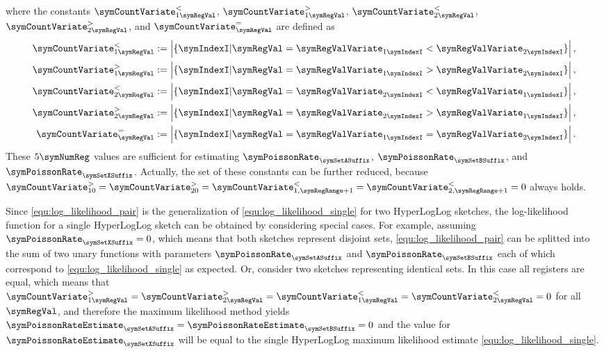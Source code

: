 \documentclass[a4paper]{scrartcl}
\begin{document}
where the constants
$\symCountVariate^{<}_{1\symRegVal}$,
$\symCountVariate^{>}_{1\symRegVal}$,
$\symCountVariate^{<}_{2\symRegVal}$,
$\symCountVariate^{>}_{2\symRegVal}$,
and $\symCountVariate^{=}_{\symRegVal}$ are defined as
\begin{equation}
\label{equ:sufficient_joint_statistic}
\begin{aligned}
\symCountVariate^{<}_{1\symRegVal}&:=\left|\lbrace\symIndexI\vert\symRegVal=\symRegValVariate_{1\symIndexI}<
\symRegValVariate_{2\symIndexI}\rbrace\right|,
\\
\symCountVariate^{>}_{1\symRegVal}&:=\left|\lbrace\symIndexI\vert\symRegVal=\symRegValVariate_{1\symIndexI}>
\symRegValVariate_{2\symIndexI}\rbrace\right|,
\\
\symCountVariate^{<}_{2\symRegVal}&:=\left|\lbrace\symIndexI\vert\symRegVal=\symRegValVariate_{2\symIndexI}<
\symRegValVariate_{1\symIndexI}\rbrace\right|,
\\
\symCountVariate^{>}_{2\symRegVal}&:=\left|\lbrace\symIndexI\vert\symRegVal=\symRegValVariate_{2\symIndexI}>
\symRegValVariate_{1\symIndexI}\rbrace\right|,
\\
\symCountVariate^{=}_{\symRegVal}&:=\left|\lbrace\symIndexI\vert\symRegVal=\symRegValVariate_{1\symIndexI}=
\symRegValVariate_{2\symIndexI}\rbrace\right|.
\end{aligned}
\end{equation}
These $5\symNumReg$ values are sufficient for estimating $\symPoissonRate_\symSetASuffix$, $\symPoissonRate_\symSetBSuffix$, and $\symPoissonRate_\symSetXSuffix$. Actually, the set of these constants can be further reduced, because $\symCountVariate^{>}_{10}=\symCountVariate^{>}_{20}=
\symCountVariate^{<}_{1,\symRegRange+1}=\symCountVariate^{<}_{2,\symRegRange+1}=0$
always holds.

Since \eqref{equ:log_likelihood_pair} is the generalization of \eqref{equ:log_likelihood_single} for two HyperLogLog sketches, the log-likelihood function for a single HyperLogLog sketch can be obtained by considering special cases. For example, assuming $\symPoissonRate_\symSetXSuffix=0$, which means that both sketches represent disjoint sets, \eqref{equ:log_likelihood_pair} can be splitted into the sum of two unary functions with parameters $\symPoissonRate_\symSetASuffix$ and $\symPoissonRate_\symSetBSuffix$ each of which correspond to \eqref{equ:log_likelihood_single} as expected. Or, consider two sketches representing identical sets. In this case all registers are equal, which means  that $\symCountVariate^{>}_{1\symRegVal}=\symCountVariate^{>}_{2\symRegVal}=
\symCountVariate^{<}_{1\symRegVal}=\symCountVariate^{<}_{2\symRegVal}=0$ for all $\symRegVal$, and therefore the maximum likelihood method yields $\symPoissonRateEstimate_\symSetASuffix = \symPoissonRateEstimate_\symSetBSuffix = 0$ and the value for $\symPoissonRateEstimate_\symSetXSuffix$ will be equal to the single HyperLogLog maximum likelihood estimate \eqref{equ:log_likelihood_single}.
\end{document}
